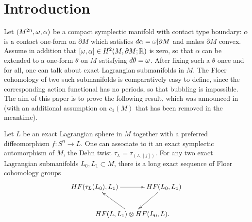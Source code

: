 \documentclass[10pt,letterpaper]{article}
\begin{document}
%

\section*{Introduction}

Let $(M^{2n},\omega,\alpha)$ be a compact symplectic manifold with contact type
boundary: $\alpha$ is a contact one-form on $\partial M$ which satisfies
$d\alpha = \omega|\partial M$ and makes $\partial M$ convex. Assume in addition
that $[\omega,\alpha] \in H^2(M,\partial M;\mathbb{R})$ is zero, so that $\alpha$ can be
extended to a one-form $\theta$ on $M$ satisfying $d\theta = \omega$. After fixing
such a $\theta$ once and for all, one can talk about exact Lagrangian
submanifolds in $M$. The Floer cohomology of two such submanifolds is
comparatively easy to define, since the corresponding action functional has no
periods, so that bubbling is impossible. The aim of this paper is to prove the
following result, which was announced in \cite{seidel00} (with an additional
assumption on $c_1(M)$ that has been removed in the meantime).

\begin{itheorem} \label{th:main}
Let $L$ be an exact Lagrangian sphere in $M$ together with a preferred
diffeomorphism $f: S^n \rightarrow L$. One can associate to it an exact
symplectic automorphism of $M$, the Dehn twist $\tau_L = \tau_{(L,[f])}$. For
any two exact Lagrangian submanifolds $L_0,L_1 \subset M$, there is a long
exact sequence of Floer cohomology groups
\begin{equation} \label{eq:exact} \xymatrix@C=-4em{
 {HF(\tau_L(L_0),L_1)} \ar[rr] && {HF(L_0,L_1)} \ar[dl] \\
 & {HF(L,L_1) \otimes HF(L_0,L).} \ar[ul]
}
\end{equation}
\end{itheorem}
\end{document}
